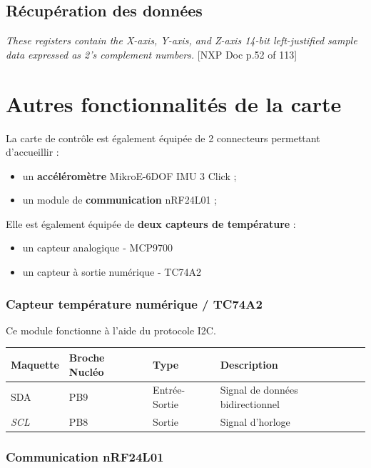 \documentclass[a4paper,11pt,titlepage]{article} %
\begin{document}
\subsection{Récupération des données}

\textit{These registers contain the X-axis, Y-axis, and Z-axis 14-bit left-justified sample data expressed as 2's complement numbers.} [NXP Doc p.52 of 113] 


\section{Autres fonctionnalités de la carte}

La carte de contrôle est également équipée de 2 connecteurs permettant d'accueillir :

\begin{itemize}
	\item un \textbf{accéléromètre} MikroE-6DOF IMU 3 Click ;
	\item un module de \textbf{communication} nRF24L01 ;
\end{itemize}

Elle est également équipée de \textbf{deux capteurs de température} :
\begin{itemize}
	\item un capteur analogique - MCP9700
	\item un capteur à sortie numérique - TC74A2
\end{itemize}


\subsubsection{Capteur température numérique / TC74A2}

Ce module fonctionne à l'aide du protocole I2C.

\begin{center}
\begin{tabular}{|l|l|l|l|}
\hline 
Maquette & \textbf{Broche Nucléo} & Type & Description \\ 
\hline 
\textsc{SDA} & PB9 & Entrée-Sortie & Signal de données bidirectionnel \\ 
\textit{SCL} & PB8 & Sortie & Signal d'horloge\\
\hline 
\end{tabular} 
\end{center}


\subsubsection{Communication nRF24L01}
\end{document}

